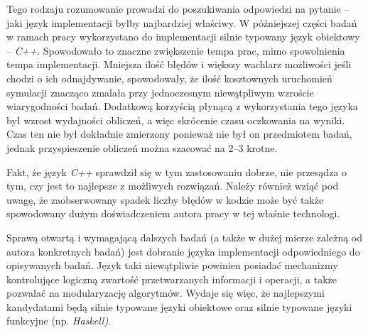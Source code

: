 \documentclass[12pt,a4paper]{report}
\begin{document}
{{{{{{{{}
\par{
Tego rodzaju rozumowanie prowadzi do poszukiwania odpowiedzi na pytanie -- jaki język implementacji byłby najbardziej właściwy. W późniejszej części badań w ramach pracy wykorzystano do implementacji silnie typowany język obiektowy -- \emph{C++}. Spowodowało to znaczne zwiększenie tempa prac, mimo spowolnienia tempa implementacji. Mniejsza ilość błędów i większy wachlarz możliwości jeśli chodzi o ich odnajdywanie, spowodowały, że ilość kosztownych uruchomień symulacji znacząco zmalała przy jednoczesnym niewątpliwym wzroście wiarygodności badań. Dodatkową korzyścią płynącą z wykorzystania tego języka był wzrost wydajności obliczeń, a więc skrócenie czasu oczkowania na wyniki. Czas ten nie był dokładnie zmierzony ponieważ nie był on przedmiotem badań, jednak przyspieszenie obliczeń można szacować na 2--3 krotne.
}
\par{
Fakt, że język \emph{C++} sprawdził się w tym zastosowaniu dobrze, nie przesądza o tym, czy jest to najlepsze z możliwych rozwiązań. Należy również wziąć pod uwagę, że zaobserwowany spadek liczby błędów w kodzie może być także spowodowany dużym doświadczeniem autora pracy w tej właśnie technologi.
}
\par{
Sprawą otwartą i wymagającą dalszych badań (a także w dużej mierze zależną od autora konkretnych badań) jest dobranie języka implementacji odpowiedniego do opisywanych badań. Język taki niewątpliwie powinien posiadać mechanizmy kontrolujące logiczną zwartość przetwarzanych informacji i operacji, a także pozwalać na modularyzację algorytmów. Wydaje się więc, że najlepszymi kandydatami będą silnie typowane języki obiektowe oraz silnie typowane języki funkcyjne (np. \emph{Haskell)}.
}
}}}}}}}
\end{document}
